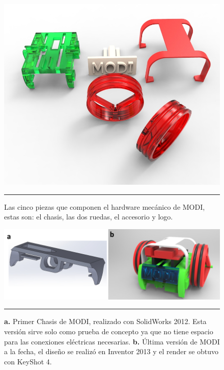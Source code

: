 \begin{figure}[htbp]
	\centering
		\includegraphics[width=\textwidth]{./Figures/MODI/piezas.jpg}
		\rule{35em}{0.5pt}
	\caption[Piezas 3D]{Las cinco piezas que componen el hardware mecánico de MODI, estas son: el chasis, las dos ruedas, el accesorio y logo.}
	\label{fig:Render Piezas 3D}
\end{figure}

\begin{figure}[htbp]
	\centering
		\includegraphics[width=\textwidth]{./Figures/MODI/compRender.png}
		\rule{35em}{0.5pt}
	\caption[Comparación entre el primer render realizado y el último]{\textbf{ a.} Primer Chasis de MODI, realizado con SolidWorks 2012. Esta versión sirve solo como prueba de concepto ya que no tiene espacio para las conexiones eléctricas necesarias.\textbf{ b.} Última versión de MODI a la fecha, el diseño se realizó en Inventor 2013 y el render se obtuvo con KeyShot 4.}
	\label{fig:compRender}
\end{figure}	


